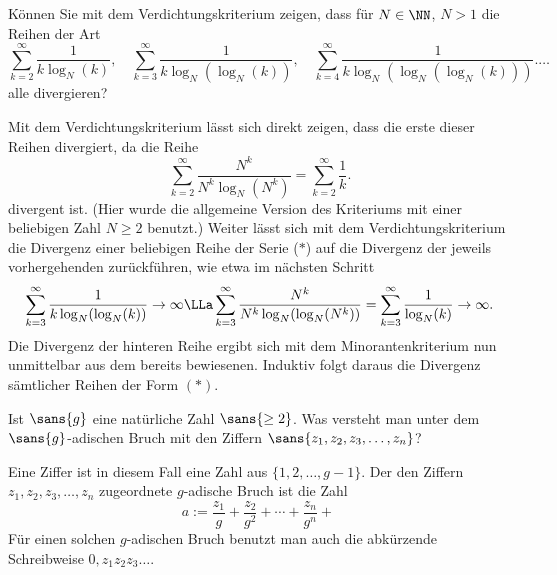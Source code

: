 \begin{frage}\label{02_verda}
  Können Sie mit dem Verdichtungskriterium zeigen, dass 
  für $N\in \NN$, $N>1$ die Reihen der Art
  \begin{equation}
    \sum_{k=2}^\infty \frac{1}{k\log_N(k)}, \quad 
    \sum_{k=3}^\infty \frac{1}{k\log_N(\log_N(k))}, \quad 
    \sum_{k=4}^\infty \frac{1}{k\log_N(\log_N(\log_N(k)))}. \ldots
    \tag{$\ast$}
  \end{equation} 
  alle divergieren?
\end{frage}

\begin{antwort}
  Mit dem Verdichtungskriterium lässt sich direkt zeigen, 
  dass die erste dieser Reihen divergiert, da die Reihe 
  \[
  \sum_{k=2}^\infty \frac{ N^k }{ N^k \log_N( N^k ) } = 
  \sum_{k=2}^\infty \frac{1}{k}.
  \]
  divergent ist. (Hier wurde die allgemeine Version des Kriteriums 
  mit einer beliebigen Zahl $N\ge2$ benutzt.) 
  Weiter lässt sich mit dem Verdichtungskriterium 
  die Divergenz einer beliebigen Reihe der Serie ($\ast$) 
  auf die Divergenz der jeweils vorhergehenden zurückführen, 
  wie etwa im nächsten Schritt 
  \[
  \sum_{k=3}^\infty \frac{1}{ k \log_N (\log_N (k) ) } \to\infty
  \LLa 
  \sum_{k=3}^\infty \frac{N^k}{ N^k \log_N (\log_N (N^k) ) } =
  \sum_{k=3}^\infty \frac{1}{ \log_N (k) }\to\infty.
  \]
  Die Divergenz der hinteren Reihe ergibt sich mit dem Minorantenkriterium 
  nun unmittelbar aus dem bereits bewiesenen. Induktiv folgt daraus  
  die Divergenz sämtlicher Reihen der Form $(\ast)$. 
  \AntEnd  
\end{antwort}

\begin{frage}\label{02_gal}
  Ist $\sans{g}$ eine natürliche Zahl $\sans{\ge 2}$. 
  Was versteht man unter dem 
  $\sans{g}$-adischen Bruch mit den Ziffern 
  $\sans{z_1, z_2, z_3, \ldots, z_n}$? 
\end{frage}

\begin{antwort}
  Eine Ziffer ist in diesem Fall eine Zahl aus $\{ 1, 2, \ldots, g-1 \}$. 
  Der den Ziffern $z_1, z_2, z_3 , \ldots, z_n $ 
  zugeordnete $g$-adische Bruch ist die Zahl  
  \[
  a := \frac{z_1}{g}+\frac{z_2}{g^2}+ \cdots + \frac{z_n}{g^n} + 
  \ 
  \]
  Für einen solchen $g$-adischen Bruch benutzt man 
  auch die abkürzende Schreibweise $0,z_1z_2z_3\ldots$. 
  \AntEnd
\end{antwort} 

